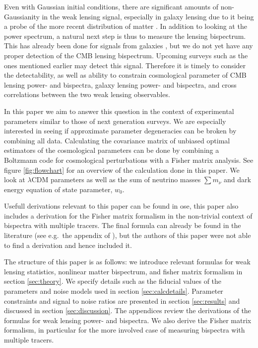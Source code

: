 \documentclass[11pt]{article} %
\begin{document}
Even with Gaussian initial conditions, there are significant amounts of non-Gaussianity in the weak lensing signal, especially in galaxy lensing due to it being a probe of the more recent distribution of matter \cite{Bernardeau1997,Takada2003}. In addition to looking at the power spectrum, a natural next step is thus to measure the lensing bispectrum. This has already been done for signals from galaxies \cite{vanWaerbeke2002}, but we do not yet have any proper detection of the CMB lensing bispectrum. Upcoming surveys such as the ones mentioned earlier may detect this signal. Therefore it is timely to consider the detectability, as well as ability to constrain cosmological parameter of CMB lensing power- and bispectra, galaxy lensing power- and bispectra, and cross correlations between the two weak lensing observables.

In this paper we aim to answer this question in the context of experimental parameters similar to those of next generation surveys. We are especially interested in seeing if approximate parameter degeneracies can be broken by combining all data. Calculating the covariance matrix of unbiased optimal estimators of the cosmological parameters can be done by combining a Boltzmann code for cosmological perturbations with a Fisher matrix analysis. See figure \ref{fig:flowchart} for an overview of the calculation done in this paper. We look at $\lambda$CDM parameters as well as the sum of neutrino masses $\sum m_\nu$ and dark energy equation of state parameter, $w_0$. 

Usefull derivations relevant to this paper can be found in ose, this paper also includes a derivation for the Fisher matrix formalism in the non-trivial context of bispectra with multiple tracers. The final formula can already be found in the literature (see e.g.\ the appendix of \cite{Kalaja_2021}), but the authors of this paper were not able to find a derivation and hence included it.

The structure of this paper is as follows: we introduce relevant formulas for weak lensing statistics, nonlinear matter bispectrum, and fisher matrix formalism in section \ref{sec:theory}. We specify details such as the fiducial values of the parameters and noise models used in section \ref{sec:calcdetails}. Parameter constraints and signal to noise ratios are presented in section \ref{sec:results} and discussed in section \ref{sec:discussion}. The appendices review the derivations of the formulas for weak lensing power- and bispectra. We also derive the Fisher matrix formalism, in particular for the more involved case of measuring bispectra with multiple tracers.
\end{document}
